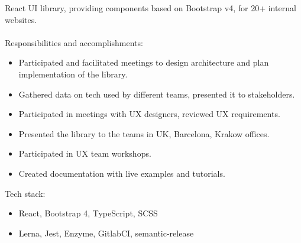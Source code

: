 \documentclass[a4paper, 14pt]{article}
\begin{document}
  React UI library, providing components based on Bootstrap v4, for 20+ internal websites. \\
  \\
  Responsibilities and accomplishments:
    \begin{itemize}
      \item Participated and facilitated meetings to design architecture and plan implementation of the library. \\
      \item Gathered data on tech used by different teams, presented it to stakeholders. \\
      \item Participated in meetings with UX designers, reviewed UX requirements. \\
      \item Presented the library to the teams in UK, Barcelona, Krakow offices. \\
      \item Participated in UX team workshops. \\
      \item Created documentation with live examples and tutorials. \\
    \end{itemize}
    \bigskip
    Tech stack:
    \begin{itemize}
      \item React, Bootstrap 4, TypeScript, SCSS \\ 
      \item Lerna, Jest, Enzyme, GitlabCI, semantic-release
    \end{itemize}
\end{document}

